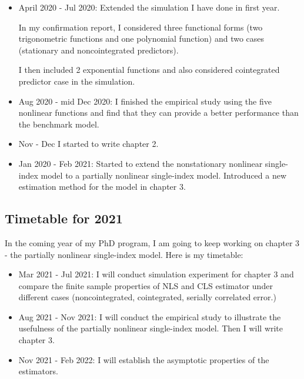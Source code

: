 \documentclass[a4paper,12pt,times,numbered,print,index]{report}
\numberwithin{equation}{section}
\begin{document}
	\begin{itemize}
		\item April 2020 - Jul 2020: Extended the simulation I have done in first year.
		
		In my confirmation report, I considered three functional forms (two trigonometric functions and one polynomial function) and two cases (stationary and noncointegrated predictors). 
		
		I then included 2 exponential functions and also considered cointegrated predictor case in the simulation. 
		
		\item Aug 2020 - mid Dec 2020: I finished the empirical study using the five nonlinear functions and find that they can provide a better performance than the benchmark model. 
		
		\item Nov - Dec I started to write chapter 2.
		
		\item Jan 2020 - Feb 2021: Started to extend the nonstationary nonlinear single-index model to a partially nonlinear single-index model. Introduced a new estimation method for the model in chapter 3.
	\end{itemize}
	
	\subsection*{Timetable for 2021}
	In the coming year of my PhD program, I am going to keep working on chapter 3 - the partially nonlinear single-index model. Here is my timetable:
	
	\begin{itemize}
		\item Mar 2021 - Jul 2021:  I will conduct simulation experiment for chapter 3 and  compare the finite sample properties of NLS and CLS estimator under different cases (noncointegrated, cointegrated, serially correlated error.)
		
		\item Aug 2021 - Nov 2021: I will conduct the empirical study to illustrate the usefulness of the partially nonlinear single-index model. Then I will write chapter 3.
		
		\item Nov 2021 - Feb 2022: I will establish the asymptotic properties of the estimators.
	\end{itemize}
	
	
	
\end{document}
